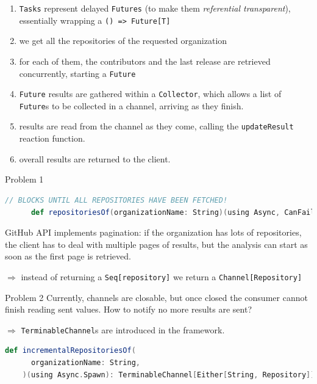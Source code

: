 \documentclass[aspectratio=1610,xcolor=dvipsnames]{beamer}
\begin{document}
%
\begin{frame}
  
  \footnotesize
  \begin{enumerate}
    \item[1)] \texttt{Tasks} represent delayed \texttt{Futures} (to make them \textit{referential transparent}), essentially wrapping a \texttt{() => Future[T]}
    \item[4)] we get all the repositories of the requested organization
    \item[5)] for each of them, the contributors and the last release are retrieved concurrently, starting a \texttt{Future}
    \item[6)] \texttt{Future} results are gathered within a \texttt{Collector}, which allows a list of \texttt{Future}s to be collected in a channel, arriving as they finish.
    \item[8)] results are read from the channel as they come, calling the \texttt{updateResult} reaction function.
    \item[9)] overall results are returned to the client.
  \end{enumerate}
\end{frame}
%
\begin{frame}[fragile]
  \begin{alertblock}{Problem 1}
    \begin{lstlisting}[language=scala, gobble=6]
      // BLOCKS UNTIL ALL REPOSITORIES HAVE BEEN FETCHED!
      def repositoriesOf(organizationName: String)(using Async, CanFail): Seq[Repository]
    \end{lstlisting}
    \small
    GitHub API implements pagination: if the organization has lots of repositories, the client has to deal with multiple pages of results, but the analysis can start as soon as the first page is retrieved.
  \end{alertblock}
  \pause
  \small$\Rightarrow$ instead of returning a \texttt{Seq[repository]} we return a \texttt{Channel[Repository]}
  \pause
  \begin{alertblock}{Problem 2}
      \small
      Currently, channels are closable, but once closed the consumer cannot finish reading sent values. How to notify no more results are sent?
  \end{alertblock}
  \pause
  \small$\Rightarrow$ \texttt{TerminableChannel}s are introduced in the framework.
  \begin{lstlisting}[language=scala, gobble=4]
    def incrementalRepositoriesOf(
      organizationName: String,
    )(using Async.Spawn): TerminableChannel[Either[String, Repository]]
  \end{lstlisting}
\end{frame}
\end{document}
